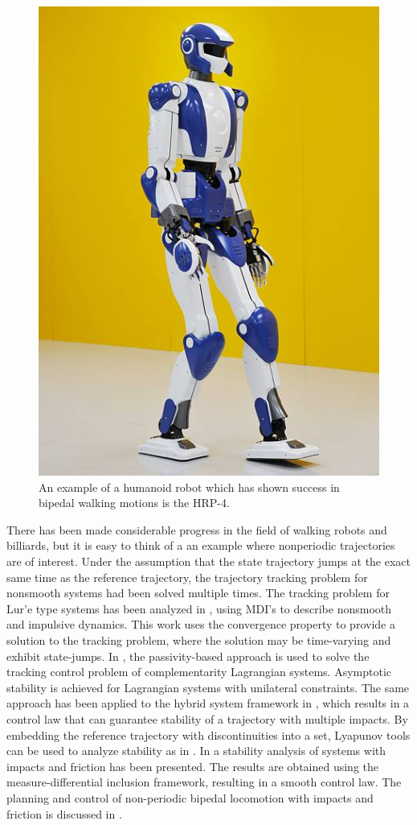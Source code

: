 \documentclass[../DC2017114Bouma.tex]{subfiles}
\begin{document}
\begin{figure}[H]
\centering
\includegraphics[width=.4\textwidth]{hrp4.jpg}\caption{An example of a humanoid robot which has shown success in bipedal walking motions is the HRP-4.}\label{fig:hrp4}
\end{figure}

There has been made considerable progress in the field of walking robots and billiards, but it is easy to think of a an example where nonperiodic trajectories are of interest. Under the assumption that the state trajectory jumps at the exact same time as the reference trajectory, the trajectory tracking problem for nonsmooth systems had been solved multiple times. The tracking problem for Lur'e type systems has been analyzed in \cite{VanDeWouw2008,Wouw2010}, using MDI's to describe nonsmooth and impulsive dynamics. This work uses the convergence property to provide a solution to the tracking problem, where the solution may be time-varying and exhibit state-jumps. In \cite{Bourgeot2005}, the passivity-based approach is used to solve the tracking control problem of complementarity Lagrangian systems. Asymptotic stability is achieved for Lagrangian systems with unilateral constraints. The same approach has been applied to the hybrid system framework in \cite{Naldi2013}, which results in a control law that can guarantee stability of a trajectory with multiple impacts. By embedding the reference trajectory with discontinuities into a set, Lyapunov tools can be used to analyze stability as in \cite{Sanfelice2011,Sanfelice2014}. In \cite{Posa2016} a stability analysis of systems with impacts and friction has been presented. The results are obtained using the measure-differential inclusion framework, resulting in a smooth control law. The planning and control of non-periodic bipedal locomotion with impacts and friction is discussed in \cite{Zhao2015a}.
\end{document}
